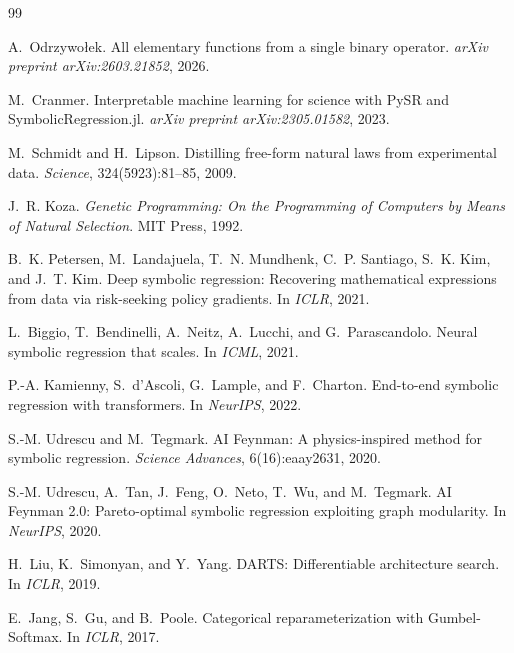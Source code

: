 \documentclass{article}
\begin{document}

\begin{thebibliography}{99}

A.~Odrzywo\l{}ek.
\newblock All elementary functions from a single binary operator.
\newblock \emph{arXiv preprint arXiv:2603.21852}, 2026.

M.~Cranmer.
\newblock Interpretable machine learning for science with PySR and
  SymbolicRegression.jl.
\newblock \emph{arXiv preprint arXiv:2305.01582}, 2023.

M.~Schmidt and H.~Lipson.
\newblock Distilling free-form natural laws from experimental data.
\newblock \emph{Science}, 324(5923):81--85, 2009.

J.~R. Koza.
\newblock \emph{Genetic Programming: On the Programming of Computers by
  Means of Natural Selection}.
\newblock MIT Press, 1992.

B.~K. Petersen, M.~Landajuela, T.~N. Mundhenk, C.~P. Santiago, S.~K. Kim,
  and J.~T. Kim.
\newblock Deep symbolic regression: Recovering mathematical expressions
  from data via risk-seeking policy gradients.
\newblock In \emph{ICLR}, 2021.

L.~Biggio, T.~Bendinelli, A.~Neitz, A.~Lucchi, and G.~Parascandolo.
\newblock Neural symbolic regression that scales.
\newblock In \emph{ICML}, 2021.

P.-A. Kamienny, S.~d'Ascoli, G.~Lample, and F.~Charton.
\newblock End-to-end symbolic regression with transformers.
\newblock In \emph{NeurIPS}, 2022.

S.-M. Udrescu and M.~Tegmark.
\newblock AI Feynman: A physics-inspired method for symbolic regression.
\newblock \emph{Science Advances}, 6(16):eaay2631, 2020.

S.-M. Udrescu, A.~Tan, J.~Feng, O.~Neto, T.~Wu, and M.~Tegmark.
\newblock AI Feynman 2.0: Pareto-optimal symbolic regression exploiting
  graph modularity.
\newblock In \emph{NeurIPS}, 2020.

H.~Liu, K.~Simonyan, and Y.~Yang.
\newblock DARTS: Differentiable architecture search.
\newblock In \emph{ICLR}, 2019.

E.~Jang, S.~Gu, and B.~Poole.
\newblock Categorical reparameterization with Gumbel-Softmax.
\newblock In \emph{ICLR}, 2017.


\end{thebibliography}
\end{document}
